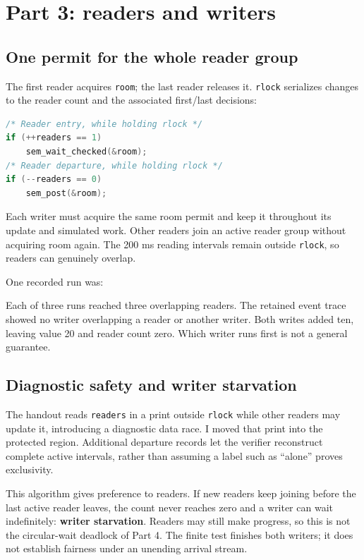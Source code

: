 \documentclass[12pt]{article}
\begin{document}
\clearpage
\section{Part 3: readers and writers}
\subsection{One permit for the whole reader group}
The first reader acquires \texttt{room}; the last reader releases it.
\texttt{rlock} serializes changes to the reader count and the associated
first/last decisions:
\begin{lstlisting}[language=C]
/* Reader entry, while holding rlock */
if (++readers == 1)
    sem_wait_checked(&room);
/* Reader departure, while holding rlock */
if (--readers == 0)
    sem_post(&room);
\end{lstlisting}
Each writer must acquire the same room permit and keep it throughout its
update and simulated work. Other readers join an active reader group
without acquiring room again. The 200 ms reading intervals remain outside
\texttt{rlock}, so readers can genuinely overlap.

One recorded run was:

Each of three runs reached three overlapping readers. The retained event
trace showed no writer overlapping a reader or another writer. Both writes
added ten, leaving value 20 and reader count zero. Which writer runs first
is not a general guarantee.

\subsection{Diagnostic safety and writer starvation}
The handout reads \texttt{readers} in a print outside \texttt{rlock} while
other readers may update it, introducing a diagnostic data race. I moved
that print into the protected region. Additional departure records let
the verifier reconstruct complete active intervals, rather than assuming
a label such as ``alone'' proves exclusivity.

This algorithm gives preference to readers. If new readers keep joining
before the last active reader leaves, the count never reaches zero and a
writer can wait indefinitely: \textbf{writer starvation}. Readers may
still make progress, so this is not the circular-wait deadlock of Part 4.
The finite test finishes both writers; it does not establish fairness
under an unending arrival stream.
\end{document}
